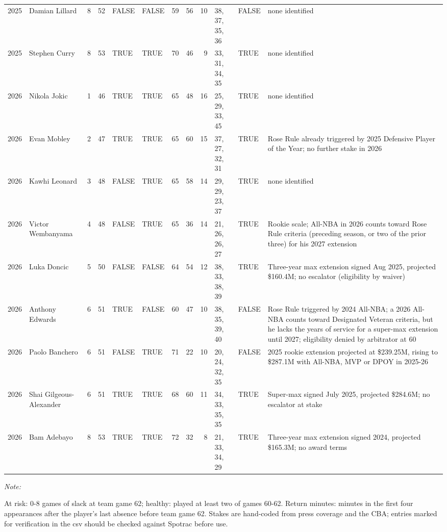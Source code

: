 \begin{table}[!h]
{\begin{threeparttable}
\begin{tabular}[t]{rlrrllrrrlll}
2025 & Damian Lillard & 8 & 52 & FALSE & FALSE & 59 & 56 & 10 & 38, 37, 35, 36 & FALSE & none identified\\
2025 & Stephen Curry & 8 & 53 & TRUE & TRUE & 70 & 46 & 9 & 33, 31, 34, 35 & TRUE & none identified\\
2026 & Nikola Jokic & 1 & 46 & TRUE & TRUE & 65 & 48 & 16 & 25, 29, 33, 45 & TRUE & none identified\\
2026 & Evan Mobley & 2 & 47 & TRUE & TRUE & 65 & 60 & 15 & 37, 27, 32, 31 & TRUE & Rose Rule already triggered by 2025 Defensive Player of the Year; no further stake in 2026\\
2026 & Kawhi Leonard & 3 & 48 & FALSE & TRUE & 65 & 58 & 14 & 29, 29, 23, 37 & TRUE & none identified\\
2026 & Victor Wembanyama & 4 & 48 & FALSE & TRUE & 65 & 36 & 14 & 21, 26, 26, 27 & TRUE & Rookie scale; All-NBA in 2026 counts toward Rose Rule criteria (preceding season, or two of the prior three) for his 2027 extension\\
2026 & Luka Doncic & 5 & 50 & FALSE & FALSE & 64 & 54 & 12 & 38, 33, 38, 39 & TRUE & Three-year max extension signed Aug 2025, projected \$160.4M; no escalator (eligibility by waiver)\\
2026 & Anthony Edwards & 6 & 51 & TRUE & FALSE & 60 & 47 & 10 & 38, 35, 39, 40 & FALSE & Rose Rule triggered by 2024 All-NBA; a 2026 All-NBA counts toward Designated Veteran criteria, but he lacks the years of service for a super-max extension until 2027; eligibility denied by arbitrator at 60\\
2026 & Paolo Banchero & 6 & 51 & FALSE & TRUE & 71 & 22 & 10 & 20, 24, 32, 35 & FALSE & 2025 rookie extension projected at \$239.25M, rising to \$287.1M with All-NBA, MVP or DPOY in 2025-26\\
2026 & Shai Gilgeous-Alexander & 6 & 51 & TRUE & TRUE & 68 & 60 & 11 & 34, 33, 35, 35 & TRUE & Super-max signed July 2025, projected \$284.6M; no escalator at stake\\
2026 & Bam Adebayo & 8 & 53 & TRUE & TRUE & 72 & 32 & 8 & 21, 33, 34, 29 & TRUE & Three-year max extension signed 2024, projected \$165.3M; no award terms\\
\bottomrule
\end{tabular}
\begin{tablenotes}
\item \textit{Note: } 
\item At risk: 0-8 games of slack at team game 62; healthy: played at least two of games 60-62. Return minutes: minutes in the first four appearances after the player's last absence before team game 62. Stakes are hand-coded from press coverage and the CBA; entries marked for verification in the csv should be checked against Spotrac before use.
\end{tablenotes}
\end{threeparttable}}
\end{table}
